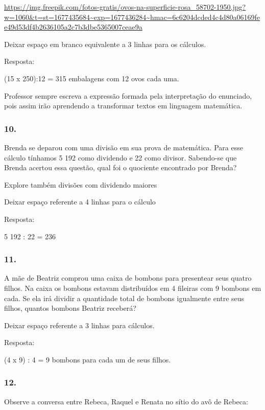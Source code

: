 \url{https://img.freepik.com/fotos-gratis/ovos-na-superficie-rosa_58702-1950.jpg?w=1060\&t=st=1677435684~exp=1677436284~hmac=6c6204dcded4c4d80a06169fee49d53df4b2636105a2c7b3dbe5365007ceae9a}

Deixar espaço em branco equivalente a 3 linhas para os cálculos.

Resposta:

(15 x 250):12 = 315 embalagens com 12 ovos cada uma.

Professor sempre escreva a expressão formada pela interpretação do
enunciado, pois assim irão aprendendo a transformar textos em linguagem
matemática.

\subsubsection{10.}\label{section-25}

Brenda se deparou com uma divisão em sua prova de matemática. Para esse
cálculo tínhamos 5 192 como dividendo e 22 como divisor. Sabendo-se que
Brenda acertou essa questão, qual foi o quociente encontrado por Brenda?

Explore também divisões com dividendo maiores

Deixar espaço referente a 4 linhas para o cálculo

Resposta:

5 192 : 22 = 236

\subsubsection{11.}\label{section-26}

A mãe de Beatriz comprou uma caixa de bombons para presentear seus
quatro filhos. Na caixa os bombons estavam distribuídos em 4 fileiras
com 9 bombons em cada. Se ela irá dividir a quantidade total de bombons
igualmente entre seus filhos, quantos bombons Beatriz receberá?

Deixar espaço referente a 3 linhas para cálculos.

Resposta:

(4 x 9) : 4 = 9 bombons para cada um de seus filhos.

\subsubsection{12.}\label{section-27}

Observe a conversa entre Rebeca, Raquel e Renata no sítio do avô de
Rebeca:

